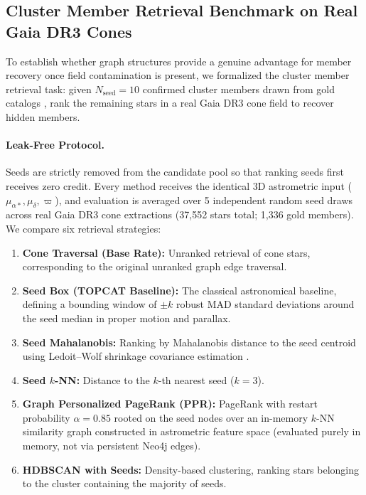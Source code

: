 \documentclass[12pt]{elsarticle}
\begin{document}
\subsection{Cluster Member Retrieval Benchmark on Real Gaia DR3 Cones}
\label{sec:retrieval_benchmark}

To establish whether graph structures provide a genuine advantage for member recovery once field contamination is present, we formalized the cluster member retrieval task: given $N_{\mathrm{seed}} = 10$ confirmed cluster members drawn from gold catalogs \citep{Hunt2023}, rank the remaining stars in a real Gaia DR3 cone field to recover hidden members.

\paragraph{Leak-Free Protocol.}
Seeds are strictly removed from the candidate pool so that ranking seeds first receives zero credit. Every method receives the identical 3D astrometric input ($\mu_{\alpha*}, \mu_\delta, \varpi$), and evaluation is averaged over 5 independent random seed draws across real Gaia DR3 cone extractions (37{,}552 stars total; 1{,}336 gold members). We compare six retrieval strategies:
\begin{enumerate}
    \item \textbf{Cone Traversal (Base Rate):} Unranked retrieval of cone stars, corresponding to the original unranked graph edge traversal.
    \item \textbf{Seed Box (TOPCAT Baseline):} The classical astronomical baseline, defining a bounding window of $\pm k$ robust MAD standard deviations around the seed median in proper motion and parallax.
    \item \textbf{Seed Mahalanobis:} Ranking by Mahalanobis distance to the seed centroid using Ledoit--Wolf shrinkage covariance estimation \citep{Ledoit2004}.
    \item \textbf{Seed $k$-NN:} Distance to the $k$-th nearest seed ($k=3$).
    \item \textbf{Graph Personalized PageRank (PPR):} PageRank with restart probability $\alpha = 0.85$ rooted on the seed nodes over an in-memory $k$-NN similarity graph constructed in astrometric feature space (evaluated purely in memory, not via persistent Neo4j edges).
    \item \textbf{HDBSCAN with Seeds:} Density-based clustering, ranking stars belonging to the cluster containing the majority of seeds.
\end{enumerate}
\end{document}
